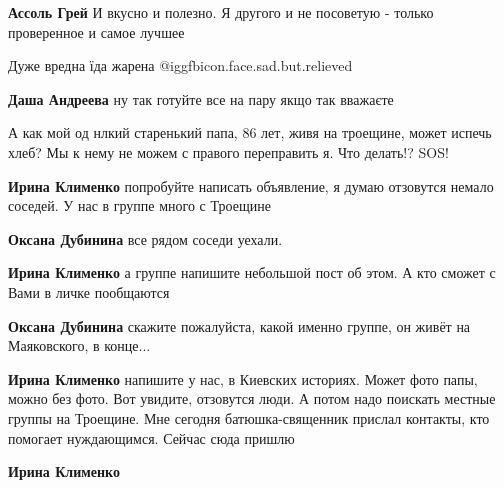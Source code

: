 \begin{itemize}
\begin{itemize}
\textbf{Ассоль Грей} И вкусно и полезно. Я другого и не посоветую - только проверенное и самое лучшее


Дуже вредна їда жарена @igg{fbicon.face.sad.but.relieved} 

\textbf{Даша Андреева} ну так готуйте все на пару якщо так вважаєте
\end{itemize} %


А как мой од нлкий старенький папа, 86 лет, живя на троещине, может испечь
хлеб? Мы к нему не можем с правого переправить я. Что делать!? SOS!

\begin{itemize} %
\textbf{Ирина Клименко} попробуйте написать объявление, я думаю отзовутся немало соседей. У нас в группе много с Троещине

\begin{itemize} %
\textbf{Оксана Дубинина} все рядом соседи уехали.

\textbf{Ирина Клименко} а группе напишите небольшой пост об этом. А кто сможет с Вами в личке пообщаются

\textbf{Оксана Дубинина} скажите пожалуйста, какой именно группе, он живёт на Маяковского, в конце...

\textbf{Ирина Клименко} напишите у нас, в Киевских историях. Может фото папы, можно без фото. Вот увидите, отзовутся люди. А потом надо поискать местные группы на Троещине.
Мне сегодня батюшка-священник прислал контакты, кто помогает нуждающимся. Сейчас сюда пришлю

\textbf{Ирина Клименко}
\end{itemize} %


\end{itemize} %

\end{itemize} %
